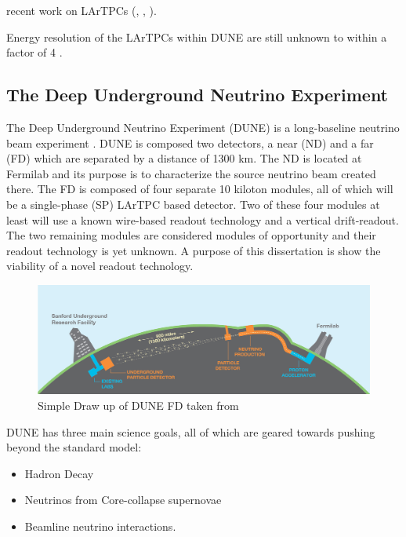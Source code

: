 recent work on LArTPCs (\citep{ArgoNeuT:PhysRevD.99.012002}, \citep{MicroBooNE:Acciarri_2017}, \citep{LArIAT:Acciarri_2020}).


Energy resolution of the LArTPCs within DUNE are still unknown to within a factor of 4 \citep{lartpc_energy_resolution:PhysRevD.99.036009}.



\subsection{The Deep Underground Neutrino Experiment}

The Deep Underground Neutrino Experiment (DUNE) is a long-baseline neutrino beam experiment \cite{DUNE_TDR_V1_Abi_2020, DUNE_FD_TDRv2_2020, DUNE_TDRv3_Abi_2020, DUNE-FD_TDRv4:Abi_2020}. 
DUNE is composed two detectors, a near (ND) and a far (FD) which are separated by a distance of 1300 km. 
The ND is located at Fermilab and its purpose is to characterize the source neutrino beam created there.
The FD is composed of four separate 10 kiloton modules, all of which will be a single-phase (SP) LArTPC based detector.
Two of these four modules at least will use a known wire-based readout technology and a vertical drift-readout.
The two remaining modules are considered modules of opportunity and their readout technology is yet unknown.
A purpose of this dissertation is show the viability of a novel readout technology.

\begin{figure}[]
\centering
\includegraphics[width=\textwidth]{images/LBNE_Graphic_061615_2016.jpg}
\caption{Simple Draw up of DUNE FD taken from \citep{dune_cdr_2016_arxiv}}
\end{figure}

DUNE has three main science goals, all of which are geared towards pushing beyond the standard model:
\begin{itemize}
    \item Hadron Decay
    \item Neutrinos from Core-collapse supernovae
    \item Beamline neutrino interactions.
\end{itemize}


